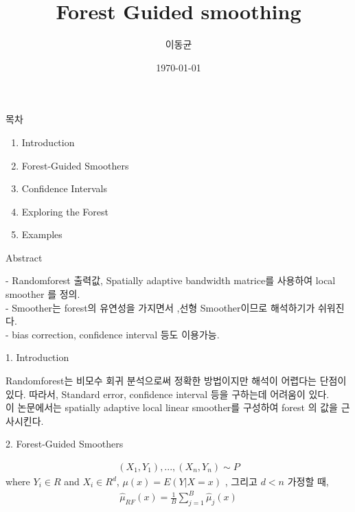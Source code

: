 \documentclass[mathserif]{beamer}
\title{Forest Guided smoothing}
\author{이동균}
\date{\today}
\begin{document}
\begin{frame}
    \titlepage
\end{frame}


\begin{frame}{목차}

    \begin{enumerate}
        \item Introduction
        
        \item Forest-Guided Smoothers
        
        \item Confidence Intervals
        
        \item Exploring the Forest
        
        \item Examples
    \end{enumerate}
\end{frame}


\begin{frame}{Abstract}

- Randomforest 출력값, Spatially adaptive bandwidth matrice를 사용하여 local smoother 를 정의.\\
- Smoother는 forest의 유연성을 가지면서 ,선형 Smoother이므로 해석하기가 쉬워진다.\\
- bias correction, confidence interval 등도 이용가능.
\end{frame}

\begin{frame}{1. Introduction}

Randomforest는 비모수 회귀 분석으로써 정확한 방법이지만 해석이 어렵다는 단점이 있다. 따라서, Standard error, confidence interval 등을 구하는데 어려움이 있다. \\이 논문에서는 spatially adaptive local linear smoother를 구성하여 forest 의 값을 근사시킨다.

\end{frame}



\begin{frame}{2. Forest-Guided Smoothers}


\begin{align*}
    (X_1,Y_1),...,(X_n,Y_n) \sim P
\end{align*}
where $Y_i \in R$ and $X_i \in R^d$, $\mu(x)=E(Y|X=x)$ , 그리고 $d<n$ 가정할 때,
\begin{align*}
    \hat{\mu}_{RF}(x) = \frac{1}{B}\sum_{j=1}^B\hat{\mu}_{j}(x)
\end{align*}

\end{frame}
\end{document}
